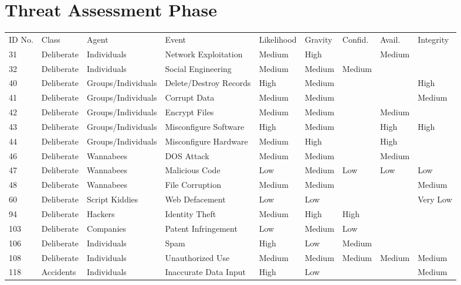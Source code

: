 \documentclass{article}
\numberwithin{equation}{section} %
\numberwithin{figure}{section} %
\numberwithin{table}{section} %
\begin{document}
\section{Threat Assessment Phase}
\small
\begin{center}
\begin{adjustwidth}{-4cm}{}
    \begin{tabular}{ l | l | l | l | l | l | l | l | l}
    \hline
    ID No. & Class & Agent & Event & Likelihood & Gravity & Confid. & Avail. & Integrity \\
    31 & Deliberate & Individuals & Network Exploitation & Medium & High &  & Medium &  \\ 
    32 & Deliberate & Individuals & Social Engineering & Medium & Medium & Medium &  &  \\
    40 & Deliberate & Groups/Individuals & Delete/Destroy Records & High & Medium &  &  & High \\
    41 & Deliberate & Groups/Individuals & Corrupt Data & Medium & Medium &  &  & Medium \\
    42 & Deliberate & Groups/Individuals & Encrypt Files & Medium & Medium &  & Medium &  \\
    43 & Deliberate & Groups/Individuals & Misconfigure Software & High & Medium &  & High & High \\
    44 & Deliberate & Groups/Individuals & Misconfigure Hardware & Medium & High &  & High &  \\
    46 & Deliberate & Wannabees & DOS Attack & Medium & Medium &  & Medium &  \\
    47 & Deliberate & Wannabees & Malicious Code & Low & Medium & Low & Low & Low \\
    48 & Deliberate & Wannabees & File Corruption & Medium & Medium &  &  & Medium \\
    60 & Deliberate & Script Kiddies & Web Defacement & Low & Low &  &  & Very Low \\
    94 & Deliberate & Hackers & Identity Theft & Medium & High & High &  &  \\
    103 & Deliberate & Companies & Patent Infringement & Low & Medium & Low &  &  \\
    106 & Deliberate & Individuals & Spam & High & Low & Medium &  &  \\
    108 & Deliberate & Individuals & Unauthorized Use & Medium & Medium & Medium & Medium & Medium \\
    118 & Accidents & Individuals & Inaccurate Data Input & High & Low &  &  & Medium \\

\end{tabular}
\end{adjustwidth}
\end{center}
\end{document}
